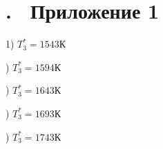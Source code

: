 \newpage
{}

\section*{. \ Приложение 1}

1) $T_3^*=1543 \text{К}$
\begin{center}
{\scriptsize
  
}
\end{center}

) $T_3^*=1594 \text{К}$

{\scriptsize
  
}

) $T_3^*=1643 \text{К}$

{\scriptsize
  
}

) $T_3^*=1693 \text{К}$

{\scriptsize
  
}

) $T_3^*=1743 \text{К}$

{\scriptsize
  
}